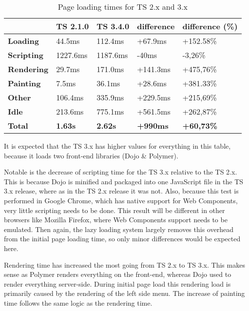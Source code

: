 \documentclass[journal,compsoc,a4paper]{IEEEtran}
\begin{document}
\begin{table}
  \begin{center}
    \begin{tabular}{| l | l | l | l | l |}
    \hline
     & TS 2.1.0 & TS 3.4.0 & difference & difference (\%) \\ \hline
    \textbf{Loading} & 44.5ms & 112.4ms & +67.9ms & +152.58\%  \\ \hline
    \textbf{Scripting} & 1227.6ms & 1187.6ms & -40ms & -3,26\% \\ \hline
    \textbf{Rendering} & 29.7ms & 171.0ms & +141.3ms & +475,76\% \\ \hline
    \textbf{Painting} & 7.5ms & 36.1ms & +28.6ms & +381.33\% \\ \hline
    \textbf{Other} & 106.4ms & 335.9ms & +229.5ms & +215,69\% \\ \hline
    \textbf{Idle} & 213.6ms & 775.1ms & +561.5ms & +262,87\% \\ \hline \hline
    \textbf{Total} & \textbf{1.63s} & \textbf{2.62s} & \textbf{+990ms} & \textbf{+60,73\%} \\ \hline
    \end{tabular}
  \end{center}
  \caption{Page loading times for TS 2.x and 3.x}
  \label{tbl:loadingtimes}
\end{table}

It is expected that the TS 3.x has higher values for everything in this table,
because it loads two front-end libraries (Dojo \& Polymer).

Notable is the decrease of scripting time for the TS 3.x relative to the
TS 2.x. This is because Dojo is minified and packaged into one JavaScript file
in the TS 3.x release, where as in the TS 2.x release it was not.
Also, because this test is performed in Google Chrome, which has native support
for Web Components, very little scripting needs to be done.
This result will be different in other browsers like Mozilla Firefox, where
Web Components support needs to be emulated. Then again, the lazy loading system
largely removes this overhead from the initial page loading time, so only minor
differences would be expected here.

Rendering time has increased the most going from TS 2.x to TS 3.x. This makes
sense as Polymer renders everything on the front-end, whereas Dojo used to render
everything server-side.
During initial page load this rendering load is primarily caused by the rendering
of the left side menu.
The increase of painting time follows the same logic as the rendering time.
\end{document}
